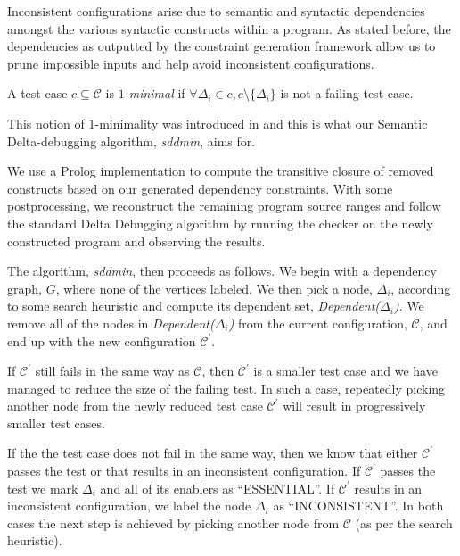 \documentclass[preprint]{acm_proc_article-sp}
\newenvironment{definition}[1][Definition]{\begin{trivlist}
\item[\hskip \labelsep {\bfseries #1}]}{\end{trivlist}}
\begin{document}
Inconsistent configurations arise due to semantic and syntactic dependencies
amongst the various syntactic constructs within a program. As stated before, the
dependencies as outputted by the constraint generation framework allow us to
prune impossible inputs and help avoid inconsistent configurations.


\begin{definition}
A test case $c \subseteq \mathcal{C}$ is \emph{$1$-minimal} if $\forall \Delta_i
\in c, c \setminus \{ \Delta_i \}$ is not a failing test case.
\end{definition}

This notion of $1$-minimality was introduced in \citep{zeller99} and this is
what our Semantic Delta-debugging algorithm, \emph{sddmin}, aims for. 

We use a Prolog implementation to compute the transitive closure of removed
constructs based on our generated dependency constraints.  With some
postprocessing, we reconstruct the remaining program source ranges and follow
the standard Delta Debugging algorithm by running the checker on the newly
constructed program and observing the results.

The algorithm, \emph{sddmin}, then proceeds as follows. We begin with a
dependency graph, $G$, where none of the vertices labeled. We then pick a node,
$\Delta_i$, according to some search heuristic and compute its dependent set,
\emph{Dependent($\Delta_i$)}. We remove all of the nodes in
\emph{Dependent($\Delta_i$)} from the current configuration, $\mathcal{C}$, and
end up with the new configuration $\mathcal{C}^{'}$. 

If $\mathcal{C}^{'}$ still fails in the same way as $\mathcal{C}$, then
$\mathcal{C}^{'}$ is a smaller test case and we have managed to reduce the size
of the failing test. In such a case, repeatedly picking another node from the
newly reduced test case $\mathcal{C}^{'}$ will result in progressively smaller
test cases.

If the the test case does not fail in the same way, then we know that either
$\mathcal{C}^{'}$ passes the test or that results in an inconsistent
configuration. If $\mathcal{C}^{'}$ passes the test we mark $\Delta_i$ and all
of its enablers as ``ESSENTIAL''. If $\mathcal{C}^{'}$ results in an
inconsistent configuration, we label the node $\Delta_i$ as ``INCONSISTENT''.
In both cases the next step is achieved by picking another node from
$\mathcal{C}$ (as per the search heuristic).
\end{document}
